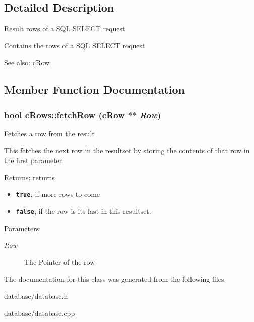 \subsection{Detailed Description}
Result rows of a SQL SELECT request

Contains the rows of a SQL SELECT request

\begin{Desc}
\item[See also:]\hyperlink{classcRow}{cRow} \end{Desc}


\subsection{Member Function Documentation}
\hypertarget{classcRows_03a454862807c81280fd7b87b35ba19e}{
\subsubsection[{fetchRow}]{\setlength{\rightskip}{0pt plus 5cm}bool cRows::fetchRow ({\bf cRow} $\ast$$\ast$ {\em Row})}}
\label{classcRows_03a454862807c81280fd7b87b35ba19e}


Fetches a row from the result

This fetches the next row in the resultset by storing the contents of that row in the first parameter.

\begin{Desc}
\item[Returns:]returns\begin{itemize}
\item {\bf {\tt true},} if more rows to come\item {\bf {\tt false},} if the row is its last in this resultset. \end{itemize}
\end{Desc}
\begin{Desc}
\item[Parameters:]
\begin{description}
\item[{\em Row}]The Pointer of the row \end{description}
\end{Desc}


The documentation for this class was generated from the following files:\begin{CompactItemize}
\item 
database/database.h\item 
database/database.cpp\end{CompactItemize}
